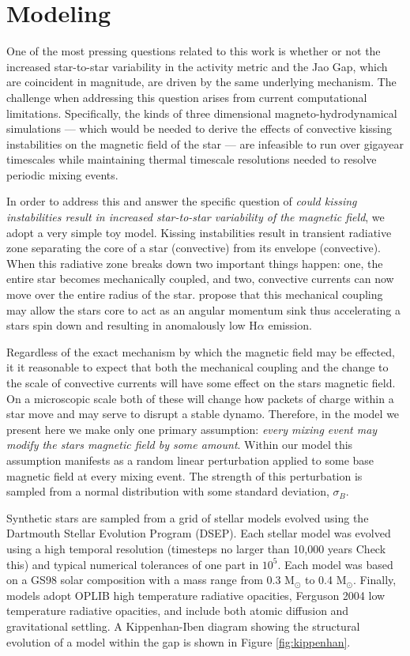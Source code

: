 \section{Modeling}\label{sec:modeling}
One of the most pressing questions related to this work is whether or not the
increased star-to-star variability in the activity metric and the Jao Gap,
which are coincident in magnitude, are driven by the same underlying mechanism.
The challenge when addressing this question arises from current computational
limitations. Specifically, the kinds of three dimensional
magneto-hydrodynamical simulations --- which would be needed to derive the
effects of convective kissing instabilities on the magnetic field of the star
--- are infeasible to run over gigayear timescales while maintaining thermal
timescale resolutions needed to resolve periodic mixing events.

In order to address this and answer the specific question of \textit{could
kissing instabilities result in increased star-to-star variability of the
magnetic field}, we adopt a very simple toy model. Kissing instabilities result
in transient radiative zone separating the core of a star (convective) from its
envelope (convective). When this radiative zone breaks down two important
things happen: one, the entire star becomes mechanically coupled, and two,
convective currents can now move over the entire radius of the star.
\citet{Jao2023} propose that this mechanical coupling may allow the stars core
to act as an angular momentum sink thus accelerating a stars spin down and
resulting in anomalously low H$\alpha$ emission. 

Regardless of the exact mechanism by which the magnetic field may be effected,
it it reasonable to expect that both the mechanical coupling and the change to
the scale of convective currents will have some effect on the stars magnetic
field. On a microscopic scale both of these will change how packets of charge
within a star move and may serve to disrupt a stable dynamo. Therefore, in the
model we present here we make only one primary assumption: \textit{every mixing
event may modify the stars magnetic field by some amount}. Within our model
this assumption manifests as a random linear perturbation applied to some base
magnetic field at every mixing event. The strength of this perturbation is 
sampled from a normal distribution with some standard deviation, $\sigma_{B}$.

Synthetic stars are sampled from a grid of stellar models evolved using the
Dartmouth Stellar Evolution Program (DSEP). Each stellar model was evolved
using a high temporal resolution (timesteps no larger than 10,000 years
{\color{red} Check this}) and typical numerical tolerances of one part in
$10^5$. Each model was based on a GS98 \citep{Grevesse1998} solar
composition with a mass range from 0.3 M$_{\odot}$ to 0.4 M$_{\odot}$. Finally,
models adopt OPLIB high temperature radiative opacities, Ferguson 2004 low
temperature radiative opacities, and include both atomic diffusion and
gravitational settling. A Kippenhan-Iben diagram showing the structural
evolution of a model within the gap is shown in Figure \ref{fig:kippenhan}.

